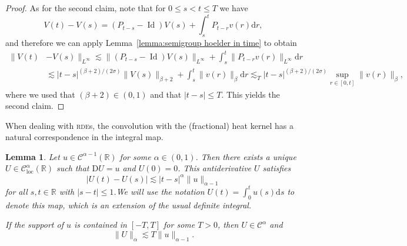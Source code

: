 \documentclass[11pt,a4paper]{article}
\newcommand{\mathD}{\mathrm{D}}
\newcommand{\mathd}{\mathrm{d}}
\newcommand{\tmop}[1]{\ensuremath{\operatorname{#1}}}
\newtheorem{lemma}[theorem]{Lemma}
\theoremstyle{remark}
\newcommand{\CC}{\ensuremath{\mathscr{C}}}
\begin{document}
\begin{proof}
  As for the second claim, note that for $0 \leqslant s<t \leqslant T$ we have
  \[
      V ( t ) -V ( s ) = ( P_{t-s} - \tmop{Id} ) V ( s ) + \int_{s}^{t} P_{t-r} v ( r ) \mathd r,
  \]
  and therefore we can apply Lemma~\ref{lemma:semigroup hoelder in time} to obtain
  \begin{align*}
     \| V ( t ) &-V ( s ) \|_{L^{\infty}}  \lesssim \| ( P_{t-s} - \tmop{Id} ) V( s ) \|_{L^{\infty}} + \int_{s}^{t} \| P_{t-r} v ( r ) \|_{L^{\infty}} \mathd r \\
     & \lesssim | t-s |^{( \beta +2 ) / ( 2 \sigma )} \| V ( s ) \|_{\beta +2} +  \int_{s}^{t} \| v ( r ) \|_{\beta} \mathd r \lesssim_{T} | t-s |^{( \beta +2 ) / ( 2 \sigma )} \sup_{r \in [ 0,t ]} \| v ( r ) \|_{\beta} ,
  \end{align*}
  where we used that $( \beta +2 ) \in ( 0,1 )$ and that $| t-s | \leqslant T$. This yields the second claim.
\end{proof}

When dealing with \textsc{rde}s, the convolution with the (fractional) heat kernel has a natural correspondence in the integral map.

\begin{lemma}\label{lemma:integral}
  Let $u \in \CC^{\alpha -1} ( \mathbb{R} )$ for some $\alpha \in ( 0,1 )$. Then there exists a unique $U \in \CC^{\alpha}_{\tmop{loc}} ( \mathbb{R} )$ such that $\mathD U=u$ and $U ( 0
  ) =0$. This antiderivative $U$ satisfies
  \begin{equation}\label{eq:integral estimate 1}
     | U ( t ) -U ( s ) | \lesssim | t-s |^{\alpha} \| u \|_{\alpha -1}
  \end{equation}
  for all $s,t \in \mathbb{R}$ with $| s-t | \leqslant 1$.We will use the notation $U ( t ) = \int_{0}^{t} u ( s ) \mathd s$ to denote this map, which is an extension of the usual definite integral.
  
  If the support of $u$ is contained in $[ -T,T ]$ for some $T>0$, then $U \in \CC^{\alpha}$ and
  \[
     \| U \|_{\alpha} \lesssim T \| u \|_{\alpha -1}.
  \]
\end{lemma}
\end{document}
